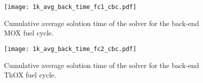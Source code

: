 \begin{figure}[h!]
  \begin{center}
    \texttt{[image: 1k\_avg\_back\_time\_fc1\_cbc.pdf]}
    \caption{
      \label{fig:1k_avg_back_time_fc1_cbc}
      Cumulative average solution time of the \cbc solver for the back-end MOX
      fuel cycle.}
  \end{center}
\end{figure}

\begin{figure}[h!]
  \begin{center}
    \texttt{[image: 1k\_avg\_back\_time\_fc2\_cbc.pdf]}
    \caption{
      \label{fig:1k_avg_back_time_fc2_cbc}
      Cumulative average solution time of the \cbc solver for the back-end ThOX
      fuel cycle.}
  \end{center}
\end{figure}





